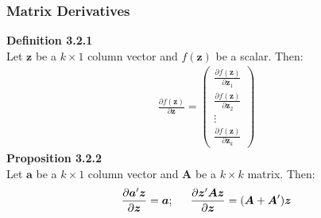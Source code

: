 \documentclass{article}
\begin{document}
\subsubsection{Matrix Derivatives}
\textbf{Definition 3.2.1}\\
Let $\boldsymbol{z}$ be a $k \times 1$ column vector and $f(\boldsymbol{z})$ be a scalar. Then:
	\begin{align*}
		\frac{\partial f(\boldsymbol{z})}{\partial \boldsymbol{z}} =
		\begin{pmatrix}
			\frac{\partial f(\boldsymbol{z})}{\partial \boldsymbol{z}_1}\\
			\frac{\partial f(\boldsymbol{z})}{\partial \boldsymbol{z}_2}\\
			\vdots\\
			\frac{\partial f(\boldsymbol{z})}{\partial \boldsymbol{z}_k}
		\end{pmatrix}
	\end{align*}
\textbf{Proposition 3.2.2}\\
Let $\boldsymbol{a}$ be a $k \times 1$ column vector and $\boldsymbol{A}$ be a $k \times k$ matrix. Then:
	\begin{align*}
		\frac{\partial \boldsymbol{a}^\prime \boldsymbol{z}}{\partial \boldsymbol{z}} = \boldsymbol{a};\indent
		\frac{\partial \boldsymbol{z}^\prime \boldsymbol{A} \boldsymbol{z}}{\partial \boldsymbol{z}} = (\boldsymbol{A} + \boldsymbol{A}^\prime)\boldsymbol{z}
	\end{align*} 
\end{document}
